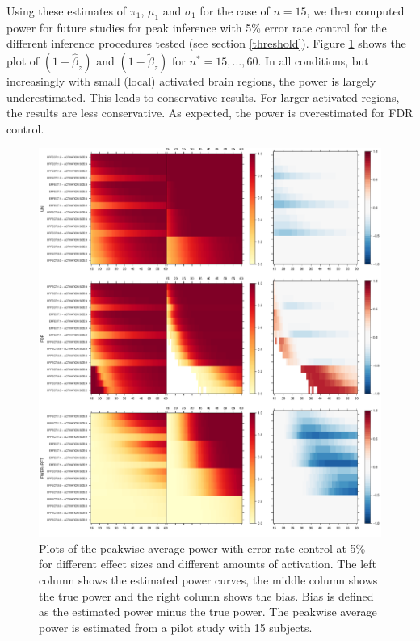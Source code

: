 Using these estimates of $\pi_1$, $\mu_1$ and $\sigma_1$ for the case of $n=15$, we then computed power for future studies for peak inference with 5\% error rate control for the different inference procedures tested (see section \ref{threshold}). Figure \ref{SIM_pow} shows the plot of $(1-\hat\beta_z)$ and $(1-\widetilde\beta_z)$ for {\color{Cyan}$n^*=15,...,60$}. In all conditions, but increasingly with small (local) activated brain regions, the power is largely underestimated.  This leads to conservative results.
For larger activated regions, the results are less conservative.  As expected, the power is overestimated for FDR control.

\begin{center}
\begin{figure}[h]
\includegraphics[scale=0.4]{figures/FIG_SIM_power_15_NOMASK_2_5.pdf}
\caption{Plots of the peakwise average power with error rate control at 5\% for different effect sizes and different amounts of activation.  The left column shows the estimated power curves, the middle column shows the true power and the right column shows the bias.  Bias is defined as the estimated power minus the true power.  The peakwise average power is estimated from a pilot study with 15 subjects. \label{SIM_pow}}
\end{figure}
\end{center}

